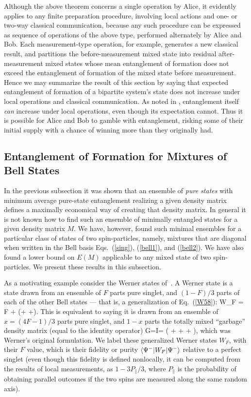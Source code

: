 Although the above theorem concerns a single operation by Alice, it
evidently applies to any finite preparation procedure, involving local
actions and one- or two-way classical communication, because any such
procedure can be expressed as sequence of operations of the above
type, performed alternately by Alice and Bob.  Each measurement-type
operation, for example,
generates a new classical result, and partitions the before-measurement
mixed state into residual after-measurement mixed states whose mean
entanglement of formation does not exceed the entanglement of formation
of the mixed state before measurement.  Hence we may summarize the
result of this section by saying that expected entanglement of
formation of a bipartite system's state does not increase under local
operations and classical communication.  As noted in
\cite{Concentration}, entanglement itself {\em can\/} increase under
local operations, even though its expectation cannot.  Thus it is
possible for Alice and Bob to gamble with entanglement, risking some of
their initial supply with a chance of winning more than they originally had.
 
\subsection{Entanglement of Formation for Mixtures of Bell States}
\label{mestates}
 
In the previous subsection it was shown that an ensemble of {\em pure
states} with minimum average pure-state entanglement realizing a given
density matrix defines a maximally economical way of creating that
density matrix.  In general it is not known how to find such an
ensemble of minimally entangled states for a given density matrix $M$.
We have, however, found such minimal ensembles for a particular class
of states of two spin-\half particles, namely, mixtures that are
diagonal when written in the Bell basis Eqs.~(\ref{sing}),
(\ref{bell1}), and (\ref{bell2}).  We have also found a lower bound on
$E(M)$ applicable to any mixed state of two spin-\half particles.  We
present these results in this subsection.
 
As a motivating example consider the Werner states of~\cite{Werner}.
A Werner state is a state drawn from an ensemble of $F$ parts
pure singlet, and $(1\!-\!F)/3$ parts of each of the other Bell
states --- that is, a generalization of Eq.~(\ref{W58}):
\beq
W_F = F\proj{\Psi^-}
+ (\proj{\Psi^+}+ \proj{\Phi^+}+\proj{\Phi^-}).\label{WF}
\eeq
This is equivalent to saying it is drawn from an ensemble of
$x=(4F\!-\!1)/3$ parts pure singlet, and $1\!-\!x$ parts the totally mixed
``garbage'' density matrix (equal to the identity operator)
\beq
G=I=
(\proj{\Psi^+} + \proj{\Psi^-} + \proj{\Phi^+} + \proj{\Phi^-}),
\label{garbage}
\eeq
which was Werner's original formulation.  We label these generalized
Werner states $W_F$, with their $F$ value, which is their fidelity or
purity $\langle \Psi^- |W_F| \Psi^- \rangle$ relative to a perfect singlet
(even though this fidelity is defined nonlocally, it can be computed
from the results of local measurements, as $1\!-\!3P_\parallel/3$, where
$P_\parallel$ is the probability of obtaining parallel outcomes if the
two spins are measured along the same random axis).
 
